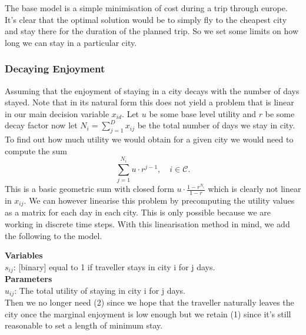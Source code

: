 \documentclass[12pt]{article}
\begin{document}
The base model is a simple minimisation of cost during a trip through europe. It's clear that the optimal solution would be to simply fly to the cheapest city and stay there for the duration of the planned trip. So we set some limits on how long we can stay in a particular city.

\newpage
\subsubsection{Decaying Enjoyment}
Assuming that the enjoyment of staying in a city decays with the number of days stayed. Note that in its natural form this does not yield a problem that is linear in our main decision variable $x_{id}$. Let $u$ be some base level utility and $r$ be some decay factor now let $N_i=\sum_{j=1}^D x_{ij}$ be the total number of days we stay in city. To find out how much utility we would obtain for a given city we would need to compute the sum
\begin{equation*}
	\sum\limits_{j=1}^{N_{i}} u \cdot r^{j-1}, \quad i \in \mathcal{C}.
\end{equation*}
This is a basic geometric sum with closed form $u \cdot \frac{1-r^{N_i}}{1-r}$ which is clearly not linear in $x_{ij}$. We can however linearise this problem by precomputing the utility values as a matrix for each day in each city. This is only possible because we are working in discrete time steps. With this linearisation method in mind, we add the following to the model.

\textbf{Variables}\\
$s_{ij}$: [binary] equal to 1 if traveller stays in city i for j days.\\

\textbf{Parameters} \\
$u_{ij}$: The total utility of staying in city i for j days.\\

Then we no longer need (2) since we hope that the traveller naturally leaves the city once the marginal enjoyment is low enough but we retain (1) since it's still reasonable to set a length of minimum stay.
\end{document}
